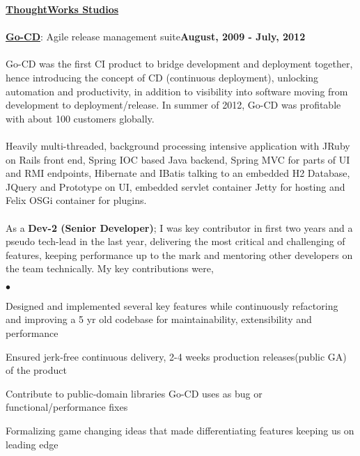 \documentclass[margin,line]{res}
\newenvironment{list2}{
  \begin{list}{$\bullet$}{%
      \setlength{\itemsep}{0in}
      \setlength{\parsep}{0in} \setlength{\parskip}{0in}
      \setlength{\topsep}{0in} \setlength{\partopsep}{0in} 
      \setlength{\leftmargin}{0.2in}}}{\end{list}}
\begin{document}
\begin{resume}
{\underline {\bf ThoughtWorks Studios}}\\
\\
\href{https://www.thoughtworks.com/go/}{\bf Go-CD}: Agile release management suite\hfill {\bf August, 2009 - July, 2012}\\
\vspace{-.2cm}\\
Go-CD was the first CI product to bridge development and deployment together, hence introducing the concept of CD (continuous deployment), unlocking automation and productivity, in addition to visibility into software moving from development to deployment/release. In summer of 2012, Go-CD was profitable with about 100 customers globally.\\
\\
Heavily multi-threaded, background processing intensive application with JRuby on Rails front end, Spring IOC based Java backend, Spring MVC for parts of UI and RMI endpoints, Hibernate and IBatis talking to an embedded H2 Database, JQuery and Prototype on UI, embedded servlet container Jetty for hosting and Felix OSGi container for plugins.\\
\\
As a {\bf Dev-2 (Senior Developer)}; I was key contributor in first two years and a pseudo tech-lead in the last year, delivering the most critical and challenging of features, keeping performance up to the mark and mentoring other developers on the team technically. My key contributions were,\\
\begin{list2}
\item Designed and implemented several key features while continuously refactoring and improving a 5 yr old codebase for maintainability, extensibility and performance
\item Ensured jerk-free continuous delivery, 2-4 weeks production releases(public GA) of the product
\item Contribute to public-domain libraries Go-CD uses as bug or functional/performance fixes
\item Formalizing game changing ideas that made differentiating features keeping us on leading edge
\end{list2}


\end{resume}
\end{document}
